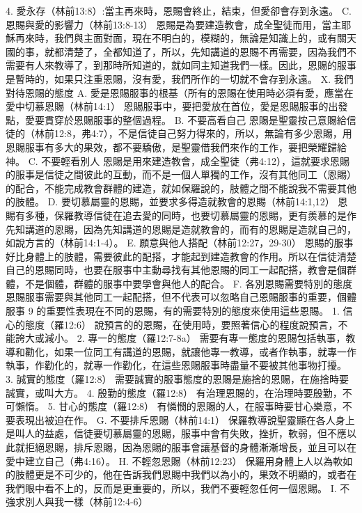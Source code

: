 4. 愛永存（林前13:8）:當主再來時，恩賜會終止，結束，但愛卻會存到永遠。
C. 恩賜與愛的影響力（林前13:8-13）
恩賜是為要建造教會，成全聖徒而用，當主耶穌再來時，我們與主面對面，現在不明白的，模糊的，無論是知識上的，或有關天國的事，就都清楚了，全都知道了，所以，先知講道的恩賜不再需要，因為我們不需要有人來教導了，到那時所知道的，就如同主知道我們一樣。因此，恩賜的服事是暫時的，如果只注重恩賜，沒有愛，我們所作的一切就不會存到永遠。
X. 我們對待恩賜的態度
A. 愛是恩賜服事的根基（所有的恩賜在使用時必須有愛，應當在愛中切慕恩賜（林前14:1）
恩賜服事中，要把愛放在首位，愛是恩賜服事的出發點，愛要貫穿於恩賜服事的整個過程。
B. 不要高看自己
恩賜是聖靈按己意賜給信徒的（林前12:8，弗4:7），不是信徒自己努力得來的，所以，無論有多少恩賜，用恩賜服事有多大的果效，都不要驕傲，是聖靈借我們來作的工作，要把榮耀歸給神。
C. 不要輕看別人
恩賜是用來建造教會，成全聖徒（弗4:12），這就要求恩賜的服事是信徒之間彼此的互動，而不是一個人單獨的工作，沒有其他同工（恩賜）的配合，不能完成教會群體的建造，就如保羅說的，肢體之間不能說我不需要其他的肢體。
D. 要切慕屬靈的恩賜，並要求多得造就教會的恩賜（林前14:1,12）
恩賜有多種，保羅教導信徒在追去愛的同時，也要切慕屬靈的恩賜，更有羨慕的是作先知講道的恩賜，因為先知講道的恩賜是造就教會的，而有的恩賜是造就自己的，如說方言的（林前14:1-4）。
E. 願意與他人搭配（林前12:27，29-30） 恩賜的服事好比身體上的肢體，需要彼此的配搭，才能起到建造教會的作用。所以在信徒清楚自己的恩賜同時，也要在服事中主動尋找有其他恩賜的同工一起配搭，教會是個群體，不是個體，群體的服事中要學會與他人的配合。
F. 各別恩賜需要特別的態度 恩賜服事需要與其他同工一起配搭，但不代表可以忽略自己恩賜服事的重要，個體服事
9
的重要性表現在不同的恩賜，有的需要特別的態度來使用這些恩賜。
1. 信心的態度（羅12:6）
說預言的的恩賜，在使用時，要照著信心的程度說預言，不能誇大或減小。
2. 專一的態度（羅12:7-8a） 需要有專一態度的恩賜包括執事，教導和勸化，如果一位同工有講道的恩賜，就讓他專一教導，或者作執事，就專一作執事，作勸化的，就專一作勸化，在這些恩賜服事時盡量不要被其他事物打擾。
3. 誠實的態度（羅12:8）
需要誠實的服事態度的恩賜是施捨的恩賜，在施捨時要誠實，或叫大方。
4. 殷勤的態度（羅12:8）
有治理恩賜的，在治理時要殷勤，不可懶惰。
5. 甘心的態度（羅12:8）
有憐憫的恩賜的人，在服事時要甘心樂意，不要表現出被迫在作。
G. 不要排斥恩賜（林前14:1）
保羅教導說聖靈顯在各人身上是叫人的益處，信徒要切慕屬靈的恩賜，服事中會有失敗，挫折，軟弱，但不應以此就拒絕恩賜，排斥恩賜，因為恩賜的服事會讓基督的身體漸漸增長，並且可以在愛中建立自己（弗4:16）。
H. 不輕忽恩賜（林前12:23） 保羅用身體上人以為軟如的肢體更是不可少的，他在告訴我們恩賜中我們以為小的，果效不明顯的，或者在我們眼中看不上的，反而是更重要的，所以，我們不要輕忽任何一個恩賜。
I. 不強求別人與我一樣（林前12:4-6）
